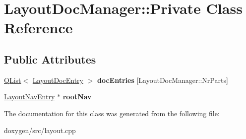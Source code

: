\hypertarget{class_layout_doc_manager_1_1_private}{}\section{Layout\+Doc\+Manager\+::Private Class Reference}
\label{class_layout_doc_manager_1_1_private}
\subsection*{Public Attributes}
\begin{DoxyCompactItemize}
\item 
\mbox{\label{class_layout_doc_manager_1_1_private_a5ce5a0b7681f897515310eb642f3d9df}} 
\mbox{\hyperlink{class_q_list}{Q\+List}}$<$ \mbox{\hyperlink{struct_layout_doc_entry}{Layout\+Doc\+Entry}} $>$ {\bfseries doc\+Entries} \mbox{[}Layout\+Doc\+Manager\+::\+Nr\+Parts\mbox{]}
\item 
\mbox{\label{class_layout_doc_manager_1_1_private_aeac2fc7fec3be235d87c5c6418ce5732}} 
\mbox{\hyperlink{struct_layout_nav_entry}{Layout\+Nav\+Entry}} $\ast$ {\bfseries root\+Nav}
\end{DoxyCompactItemize}


The documentation for this class was generated from the following file\+:\begin{DoxyCompactItemize}
\item 
doxygen/src/layout.\+cpp\end{DoxyCompactItemize}
